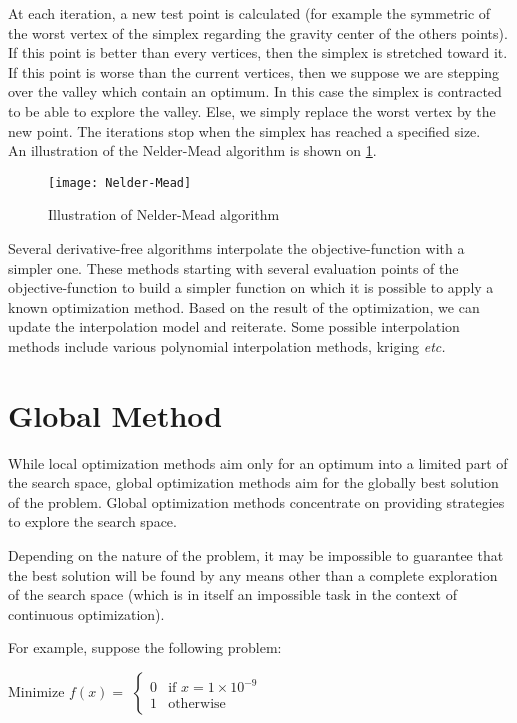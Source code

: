 At each iteration, a new test point is calculated (for example the symmetric of the worst vertex of the simplex regarding the gravity center of the others points). If this point is better than every vertices, then the simplex is stretched toward it. If this point is worse than the current vertices, then we suppose we are stepping over the valley which contain an optimum. In this case the simplex is contracted to be able to explore the valley. Else, we simply replace the worst vertex by the new point. The iterations stop when the simplex has reached a specified size.\\
An illustration of the Nelder-Mead algorithm is shown on \figurename{} \ref{nelder-mead}.

\begin{figure}
\centering
\texttt{[image: Nelder-Mead]}
\caption{Illustration of Nelder-Mead algorithm}\label{nelder-mead}
\end{figure}

Several derivative-free algorithms interpolate the objective-function with a simpler one. These methods starting with several evaluation points of the objective-function to build a simpler function on which it is possible to apply a known optimization method. Based on the result of the optimization, we can update the interpolation model and reiterate. Some possible interpolation methods include various polynomial interpolation methods, kriging \emph{etc.}

\section{Global Method}

While local optimization methods aim only for an optimum into a limited part of the search space, global optimization methods aim for the globally best solution of the problem. Global optimization methods concentrate on providing strategies to explore the search space.

Depending on the nature of the problem, it may be impossible to guarantee that the best solution will be found by any means other than a complete exploration of the search space (which is in itself an impossible task in the context of continuous optimization).

For example, suppose the following problem:

Minimize $f(x) =$ $\begin{cases}
 		 					0& \text{if } x = 1 \times 10^{-9}\\
 		 					1& \text{otherwise}
 		 			\end{cases}$
 		 			
